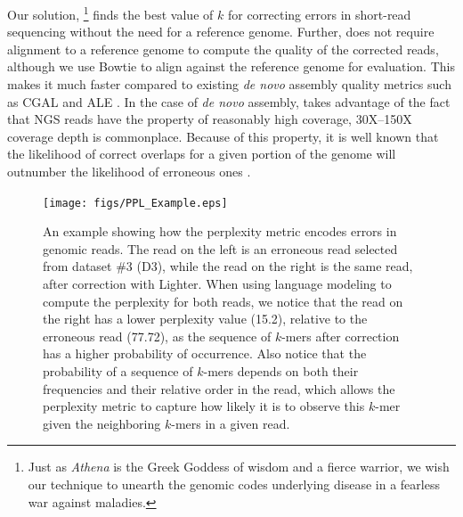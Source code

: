 Our solution, {\em \name}\footnote{Just as \textit{Athena} is the Greek Goddess of wisdom and a fierce warrior, we wish our technique to unearth the genomic codes underlying disease in a fearless war against maladies.} finds the best value of $k$ for correcting errors in short-read sequencing without the need for a reference genome. Further, \name does not require alignment to a reference genome to compute the quality of the corrected reads, although we use Bowtie to align against the reference genome for evaluation. This makes it much faster compared to existing \textit{de novo} assembly quality metrics such as CGAL \cite{rahman2013cgal} and ALE \cite{clark2013ale}. %
In the case of \textit{de novo} assembly, \name takes advantage of the fact that NGS reads have the property of reasonably high coverage, 30X--150X coverage depth is commonplace. 
Because of this property, it is well known that the likelihood of correct overlaps for a given portion of the genome will outnumber the likelihood of erroneous ones \cite{yang2010reptile}.
\begin{figure}
  \texttt{[image: figs/PPL\_Example.eps]}
  \caption{An example showing how the perplexity metric encodes errors in genomic reads. The read on the left is an erroneous read selected from dataset \#3 (D3), while the read on the right is the same read, after correction with Lighter. When using language modeling to compute the perplexity for both reads, we notice that the read on the right has a lower perplexity value (15.2), relative to the erroneous read (77.72), as the sequence of $k$-mers after correction has a higher probability of occurrence. Also notice that the probability of a sequence of $k$-mers depends on both their frequencies and their relative order in the read, which allows the perplexity metric to capture how likely it is to observe this $k$-mer given the neighboring $k$-mers in a given read.}
  \label{fig:PPL_Simple_Example}
\end{figure}
